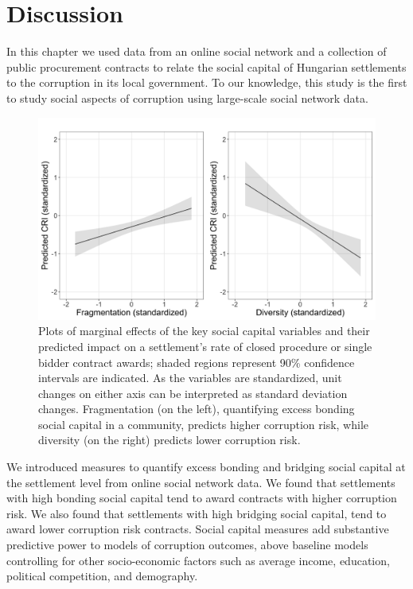 \section{Discussion}

In this chapter we used data from an online social network and a collection of public procurement contracts to relate the social capital of Hungarian settlements to the corruption in its local government. To our knowledge, this study is the first to study social aspects of corruption using large-scale social network data.

\begin{figure}[t]
\centering
 \includegraphics[width=.9\textwidth]{images/iwiw/olsmargin.png}
 \caption[Marginal effects of social capital on corruption risk.]{Plots of marginal effects of the key social capital variables and their predicted impact on a settlement's rate of closed procedure or single bidder contract awards; shaded regions represent 90\% confidence intervals are indicated. As the variables are standardized, unit changes on either axis can be interpreted as standard deviation changes. Fragmentation (on the left), quantifying excess bonding social capital in a community, predicts higher corruption risk, while diversity (on the right) predicts lower corruption risk.}
  \label{fig:olsmargins}
\end{figure}

We introduced measures to quantify excess bonding and bridging social capital at the settlement level from online social network data. We found that settlements with high bonding social capital tend to award contracts with higher corruption risk. We also found that settlements with high bridging social capital, tend to award lower corruption risk contracts. Social capital measures add substantive predictive power to models of corruption outcomes, above baseline models controlling for other socio-economic factors such as average income, education, political competition, and demography.

